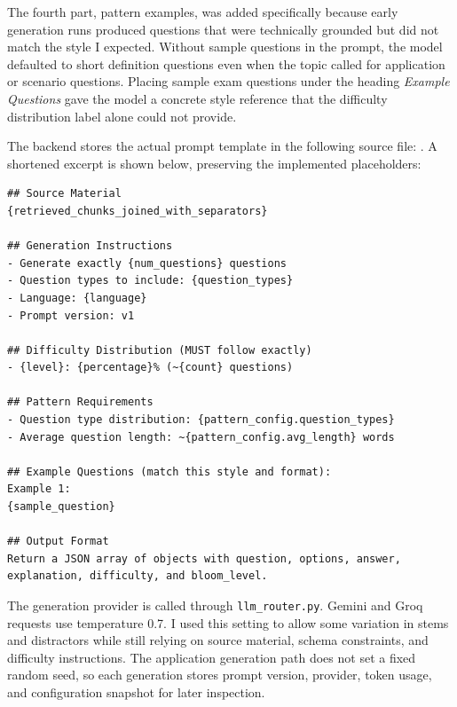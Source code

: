 \documentclass[12pt,a4paper]{article}
\begin{document}
The fourth part, pattern examples, was added specifically because early
generation runs produced questions that were technically grounded but did not
match the style I expected. Without sample questions in the prompt, the model
defaulted to short definition questions even when the topic called for
application or scenario questions. Placing sample exam questions under the
heading \textit{Example Questions} gave the model a concrete style reference
that the difficulty distribution label alone could not provide.

The backend stores the actual prompt template in the following source file:
. A shortened excerpt is
shown below, preserving the implemented placeholders:

\begin{verbatim}
## Source Material
{retrieved_chunks_joined_with_separators}

## Generation Instructions
- Generate exactly {num_questions} questions
- Question types to include: {question_types}
- Language: {language}
- Prompt version: v1

## Difficulty Distribution (MUST follow exactly)
- {level}: {percentage}% (~{count} questions)

## Pattern Requirements
- Question type distribution: {pattern_config.question_types}
- Average question length: ~{pattern_config.avg_length} words

## Example Questions (match this style and format):
Example 1:
{sample_question}

## Output Format
Return a JSON array of objects with question, options, answer,
explanation, difficulty, and bloom_level.
\end{verbatim}

The generation provider is called through \texttt{llm\_router.py}. Gemini
and Groq requests use temperature 0.7. I used this setting to allow some
variation in stems and distractors while still relying on source material,
schema constraints, and difficulty instructions. The application generation
path does not set a fixed random seed, so each generation stores prompt
version, provider, token usage, and configuration snapshot for later
inspection.
\end{document}
